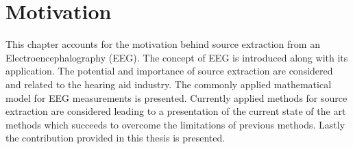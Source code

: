 \chapter{Motivation}\label{ch:motivation}
This chapter accounts for the motivation behind source extraction from an Electroencephalography (EEG). The concept of EEG is introduced along with its application. The potential and importance of source extraction are considered and related to the hearing aid industry. The commonly applied mathematical model for EEG measurements is presented. Currently applied methods for source extraction are considered leading to a presentation of the current state of the art methods which succeeds to overcome the limitations of previous methods. Lastly the contribution provided in this thesis is presented.          


